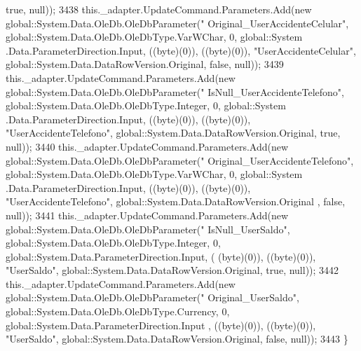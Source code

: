 \begin{DoxyCode}
{      true}, null));
3438             this.\_adapter.UpdateCommand.Parameters.Add(\textcolor{keyword}{new} global::System.Data.OleDb.OleDbParameter(\textcolor{stringliteral}{"
      Original\_UserAccidenteCelular"}, global::System.Data.OleDb.OleDbType.VarWChar, 0, global::System
      .Data.ParameterDirection.Input, ((byte)(0)), ((byte)(0)), \textcolor{stringliteral}{"UserAccidenteCelular"}, global::System.Data.DataRowVersion.Original, \textcolor{keyword}{
      false}, null));
3439             this.\_adapter.UpdateCommand.Parameters.Add(\textcolor{keyword}{new} global::System.Data.OleDb.OleDbParameter(\textcolor{stringliteral}{"
      IsNull\_UserAccidenteTelefono"}, global::System.Data.OleDb.OleDbType.Integer, 0, global::System
      .Data.ParameterDirection.Input, ((byte)(0)), ((byte)(0)), \textcolor{stringliteral}{"UserAccidenteTelefono"}, global::System.Data.DataRowVersion.Original, \textcolor{keyword}{
      true}, null));
3440             this.\_adapter.UpdateCommand.Parameters.Add(\textcolor{keyword}{new} global::System.Data.OleDb.OleDbParameter(\textcolor{stringliteral}{"
      Original\_UserAccidenteTelefono"}, global::System.Data.OleDb.OleDbType.VarWChar, 0, global::System
      .Data.ParameterDirection.Input, ((byte)(0)), ((byte)(0)), \textcolor{stringliteral}{"UserAccidenteTelefono"}, global::System.Data.DataRowVersion.Original
      , \textcolor{keyword}{false}, null));
3441             this.\_adapter.UpdateCommand.Parameters.Add(\textcolor{keyword}{new} global::System.Data.OleDb.OleDbParameter(\textcolor{stringliteral}{"
      IsNull\_UserSaldo"}, global::System.Data.OleDb.OleDbType.Integer, 0, global::System.Data.ParameterDirection.Input, (
      (byte)(0)), ((byte)(0)), \textcolor{stringliteral}{"UserSaldo"}, global::System.Data.DataRowVersion.Original, \textcolor{keyword}{true}, null));
3442             this.\_adapter.UpdateCommand.Parameters.Add(\textcolor{keyword}{new} global::System.Data.OleDb.OleDbParameter(\textcolor{stringliteral}{"
      Original\_UserSaldo"}, global::System.Data.OleDb.OleDbType.Currency, 0, global::System.Data.ParameterDirection.Input
      , ((byte)(0)), ((byte)(0)), \textcolor{stringliteral}{"UserSaldo"}, global::System.Data.DataRowVersion.Original, \textcolor{keyword}{false}, null));
3443         \}
\end{DoxyCode}
